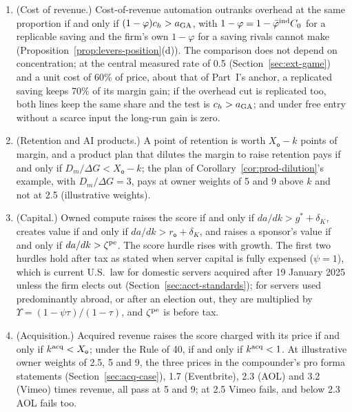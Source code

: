 \begin{proposition}
\begin{enumerate}
\item[(d)] (Cost of revenue.) Cost-of-revenue automation outranks overhead at the same proportion if and only if $(1-\varphi)c_h>a_{\rm GA}$, with $1-\varphi=1-\bar\varphi^{\rm ind}C_0$ for a replicable saving and the firm's own $1-\varphi$ for a saving rivals cannot make (Proposition~\ref{prop:levers-position}(d)). The comparison does not depend on concentration; at the central measured rate of 0.5 (Section~\ref{sec:ext-game}) and a unit cost of 60\% of price, about that of Part~I's anchor, a replicated saving keeps 70\% of its margin gain; if the overhead cut is replicated too, both lines keep the same share and the test is $c_h>a_{\rm GA}$; and under free entry without a scarce input the long-run gain is zero.
\item[(e)] (Retention and AI products.) A point of retention is worth $X_{\mathsf o}-k$ points of margin, and a product plan that dilutes the margin to raise retention pays if and only if $D_m/\Delta G<X_{\mathsf o}-k$; the plan of Corollary~\ref{cor:prod-dilution}'s example, with $D_m/\Delta G=3$, pays at owner weights of 5 and 9 above $k$ and not at 2.5 (illustrative weights). %
\item[(f)] (Capital.) Owned compute raises the score if and only if $da/dk>g^*+\delta_K$, creates value if and only if $da/dk>r_{\mathsf o}+\delta_K$, and raises a sponsor's value if and only if $da/dk>\zeta^{\rm pe}$. The score hurdle rises with growth. The first two hurdles hold after tax as stated when server capital is fully expensed ($\psi=1$), which is current U.S.\ law for domestic servers acquired after 19 January 2025 unless the firm elects out (Section~\ref{sec:acct-standards}); for servers used predominantly abroad, or after an election out, they are multiplied by $\Upsilon=(1-\psi\tau)/(1-\tau)$, and $\zeta^{\rm pe}$ is before tax.
\item[(g)] (Acquisition.) Acquired revenue raises the score charged with its price if and only if $k^{\rm acq}<X_{\mathsf o}$; under the Rule of 40, if and only if $k^{\rm acq}<1$. At illustrative owner weights of 2.5, 5 and 9, the three prices in the compounder's pro forma statements (Section~\ref{sec:acq-case}), 1.7 (Eventbrite), 2.3 (AOL) and 3.2 (Vimeo) times revenue, all pass at 5 and 9; at 2.5 Vimeo fails, and below 2.3 AOL fails too. %
\end{enumerate}
\end{proposition}

